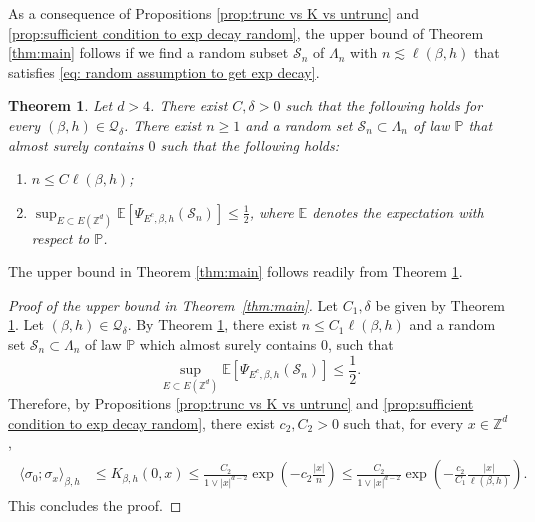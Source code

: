 \documentclass[10pt,a4paper]{amsart}
\numberwithin{equation}{section}
\newtheorem{Thm}{Theorem}[section]
\begin{document}
As a consequence of Propositions \ref{prop:trunc vs K vs untrunc} and \ref{prop:sufficient condition to exp decay random}, the upper bound of Theorem \ref{thm:main} follows if we find a random subset $\mathcal S_n$ of $\Lambda_n$ with $n\lesssim \ell(\beta,h)$ that satisfies \eqref{eq: random assumption to get exp decay}.

\begin{Thm}\label{thm:finding the good random S} Let $d>4$. There exist $C,\delta >0$ such that the following holds for every $(\beta,h)\in \mathcal Q_\delta$. There exist $n\geq 1$ and a random set $\mathcal S_n\subset \Lambda_n$ of law $\mathbb P$ that almost surely contains $0$ such that the following holds:
\begin{enumerate}
	\item[$(i)$] $n\leq C\ell(\beta,h)$;
	\item[$(ii)$] $\sup_{E\subset E(\mathbb Z^d)}\mathbb E[\Psi_{E^c,\beta,h}(\mathcal S_n)]\leq \tfrac{1}{2}$, where $\mathbb E$ denotes the expectation with respect to $\mathbb P$.
\end{enumerate}
\end{Thm}
 
The upper bound in Theorem \ref{thm:main} follows readily from Theorem \ref{thm:finding the good random S}.
 \begin{proof}[Proof of the upper bound in Theorem~\textup{\ref{thm:main}}] Let $C_1,\delta$ be given by Theorem \ref{thm:finding the good random S}. Let $(\beta,h)\in \mathcal Q_\delta$. By Theorem \ref{thm:finding the good random S}, there exist $n\leq C_1\ell(\beta,h)$ and a random set $\mathcal S_n\subset \Lambda_n$ of law $\mathbb P$ which almost surely contains $0$, such that
 \begin{equation}
 	\sup_{E\subset E(\mathbb Z^d)}\mathbb E[\Psi_{E^c,\beta,h}(\mathcal S_n)]\leq \frac{1}{2}.
 \end{equation}
Therefore, by Propositions \ref{prop:trunc vs K vs untrunc} and \ref{prop:sufficient condition to exp decay random}, there exist $c_2,C_2>0$ such that, for every $x\in \mathbb Z^d$,
 \begin{align}\label{eq:proof upper bound 1}
 \begin{aligned}
	\langle \sigma_0;\sigma_x\rangle_{\beta,h}&\leq K_{\beta,h}(0,x)\leq \frac{C_2}{1\vee |x|^{d-2}}\exp\left(-c_2\frac{|x|}{n}\right)\leq \frac{C_2}{1\vee |x|^{d-2}}\exp\left(-\frac{c_2}{C_1}\frac{|x|}{\ell(\beta,h)}\right).
	\end{aligned}
\end{align}
This concludes the proof.
\end{proof}
\end{document}
